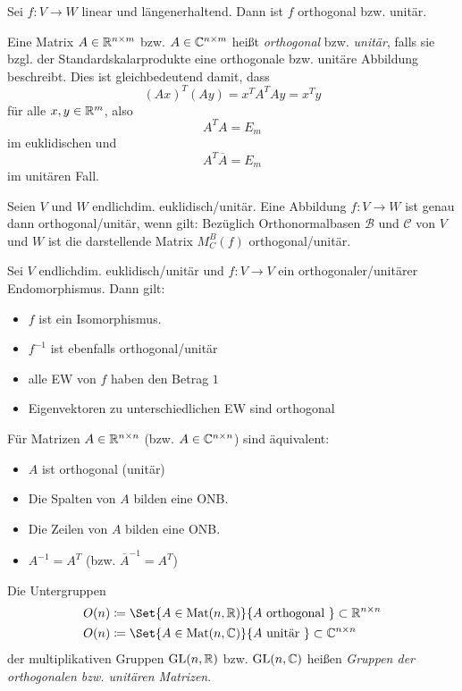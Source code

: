 \documentclass{cheat-sheet}
\DeclareMathOperator{\GL}{GL}
\DeclareMathOperator{\Mat}{Mat}
\newcommand{\BB}{\mathcal{B}}
\newcommand{\BC}{\mathcal{C}}
\begin{document}
\begin{satz}
  Sei $f : V \to W$ linear und längenerhaltend. Dann ist $f$ orthogonal bzw. unitär.
\end{satz}

\begin{defn}
  Eine Matrix $A \in \mathbb{R}^{n \times m}$ bzw. $A \in \mathbb{C}^{n \times m}$ heißt \emph{orthogonal} bzw. \emph{unitär}, falls sie bzgl. der Standardskalarprodukte eine orthogonale bzw. unitäre Abbildung beschreibt. Dies ist gleichbedeutend damit, dass
  \[ (Ax)^T (Ay) = x^T A^T Ay = x^T y \]
  für alle $x, y \in \mathbb{R}^m$, also
  \[ A^T A = E_m \]
  im euklidischen und
  \[ A^T \overline{A} = E_m \]
  im unitären Fall.
\end{defn}

\begin{satz}
  Seien $V$ und $W$ endlichdim. euklidisch/unitär. Eine Abbildung $f : V \to W$ ist genau dann orthogonal/unitär, wenn gilt: Bezüglich Orthonormalbasen $\BB$ und $\BC$ von $V$ und $W$ ist die darstellende Matrix $M_C^B(f)$ orthogonal/unitär.
\end{satz}

\begin{satz}
  Sei $V$ endlichdim. euklidisch/unitär und $f : V \to V$ ein orthogonaler/unitärer Endomorphismus. Dann gilt:
  \begin{itemize}
    \item $f$ ist ein Isomorphismus.
    \item $f^{-1}$ ist ebenfalls orthogonal/unitär
    \item alle EW von $f$ haben den Betrag $1$
    \item Eigenvektoren zu unterschiedlichen EW sind orthogonal
  \end{itemize}
\end{satz}

\begin{bem}
  Für Matrizen $A \in \mathbb{R}^{n \times n}$ (bzw. $A \in \mathbb{C}^{n \times n}$) sind äquivalent:
  \begin{itemize}
    \item $A$ ist orthogonal (unitär)
    \item Die Spalten von $A$ bilden eine ONB.
    \item Die Zeilen von $A$ bilden eine ONB.
    \item $A^{-1} = A^T$ (bzw. $\overline{A}^{-1} = A^T$)
  \end{itemize}
\end{bem}

\begin{defn}
  Die Untergruppen
  \begin{align*}
  O(n) &\coloneqq \Set{ A \in \Mat(n, \R) }{ A \text{ orthogonal } } \subset \R^{n \times n} \\
  O(n) &\coloneqq \Set{ A \in \Mat(n, \C) }{ A \text{ unitär } } \subset \C^{n \times n} \\
  \end{align*}
  der multiplikativen Gruppen $\GL(n, \R)$ bzw. $\GL(n, \C)$ heißen \emph{Gruppen der orthogonalen bzw. unitären Matrizen}.
\end{defn}
\end{document}
